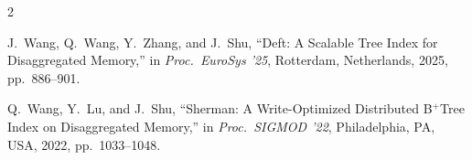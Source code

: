 \documentclass[10pt,twocolumn]{article}
\begin{document}
\begin{thebibliography}{2}

J.~Wang, Q.~Wang, Y.~Zhang, and J.~Shu,
``Deft: A Scalable Tree Index for Disaggregated Memory,''
in \emph{Proc.\ EuroSys '25}, Rotterdam, Netherlands, 2025, pp.~886--901.

Q.~Wang, Y.~Lu, and J.~Shu,
``Sherman: A Write-Optimized Distributed B$^+$Tree Index on Disaggregated
Memory,''
in \emph{Proc.\ SIGMOD '22}, Philadelphia, PA, USA, 2022, pp.~1033--1048.

\end{thebibliography}
\end{document}
